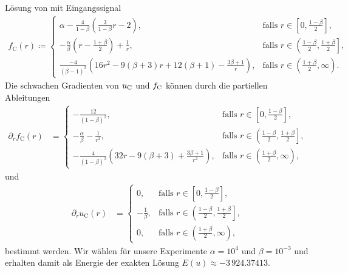 Lösung von  mit Eingangssignal
\begin{align*}
  f_\textrm{C}(r)\coloneqq 
  \begin{cases}
    \alpha - \frac{4}{1-\beta}\left(\frac{3}{1-\beta}r - 2\right)\!, 
    & \text{falls } r\in \left[0,\frac{1-\beta}{2}\right]\!,\\
    -\frac{\alpha}{\beta}\left( r-\frac{1+\beta}{2} \right) +\frac{1}{r}, 
    & \text{falls } r\in \left(\frac{1-\beta}{2}, \frac{1+\beta}{2}\right]\!,\\
    \frac{-4}{(\beta-1)^3}
    \left( 16r^2 -9(\beta+3)r + 12(\beta+1) - \frac{3\beta+1}{r}\right)\!, 
    & \text{falls } r\in \left(\frac{1+\beta}{2},\infty\right)\!.
  \end{cases}
\end{align*}
Die schwachen Gradienten von $u_\textup{C}$ und $f_\textup{C}$ können durch die
partiellen Ableitungen 
\begin{align*}
  \partial_r f_\textrm{C}(r) &= 
  \begin{cases}
    -\frac{12}{(1-\beta)^2},
    & \text{falls } r\in \left[0,\frac{1-\beta}{2}\right]\!,\\
    -\frac{\alpha}{\beta}-\frac{1}{r^2},
    & \text{falls } r\in \left(\frac{1-\beta}{2}, \frac{1+\beta}{2}\right]\!,\\
    -\frac{4}{(1-\beta)^3}\left( 32r-9(\beta+3)+\frac{3\beta+1}{r^2} \right)\!,
    & \text{falls } r\in \left(\frac{1+\beta}{2},\infty\right)\!,
  \end{cases}
\end{align*}
und
\begin{align*}
  \partial_r u_\textrm{C}(r) &= 
  \begin{cases}
    0,
    & \text{falls } r\in \left[0,\frac{1-\beta}{2}\right]\!,\\
    -\frac{1}{\beta},
    & \text{falls } r\in \left(\frac{1-\beta}{2}, \frac{1+\beta}{2}\right]\!,\\
    0,
    & \text{falls } r\in \left(\frac{1+\beta}{2},\infty\right)\!,
  \end{cases}
\end{align*}
bestimmt werden.
Wir wählen für unsere Experimente $\alpha = 10^4$ und $\beta = 10^{-3}$ und 
erhalten damit als Energie der exakten Lösung $E(u)\approx -3\,924.37413$.
